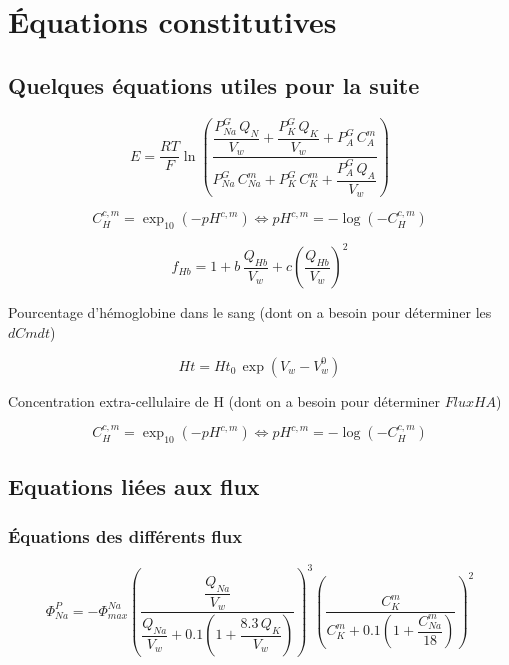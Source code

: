 \documentclass[a4paper,fleqn]{article}
\begin{document}
\section{Équations constitutives}

\subsection{Quelques équations utiles pour la suite}

\begin{equation}
E =  \frac{RT}{F}\ln{\left(\frac{\dfrac{P_{Na}^G\,Q_N}{V_w} + \dfrac{P_K^G\,Q_K}{V_w} + P_A^G\,C_A^m}{P_{Na}^G\,C_{Na}^m + P_K^G\,C_K^m + \dfrac{P_A^G\,Q_A}{V_w}}\right)}
\end{equation}

\begin{equation}
{C_{H}^{c,m}=\exp_{10}{\left(-pH^{c,m}\right)}}\Longleftrightarrow{pH^{c,m}=-\log{\left(-C_{H}^{c,m}\right)}}
\end{equation}

\begin{equation}
f_{Hb}=1+b\,\frac{Q_{Hb}}{V_w }+{c}\left(\frac{Q_{Hb}}{V_w }\right)^2
\end{equation}

Pourcentage d'hémoglobine dans le sang (dont on a besoin pour déterminer les $dCmdt$)

\begin{equation}
Ht = Ht_0\,\exp{(V_w-V_w^0)}
\end{equation}

Concentration extra-cellulaire de H (dont on a besoin pour déterminer $FluxHA$)

\begin{equation}
{C_{H}^{c,m}=\exp_{10}{\left(-pH^{c,m}\right)}}\Longleftrightarrow{pH^{c,m}=-\log{\left(-C_{H}^{c,m}\right)}}
\end{equation}

\subsection{Equations liées aux flux}
\subsubsection*{Équations des différents flux}

\begin{equation}
\Phi_{Na}^{P}=-\Phi_{max}^{Na}\left(\frac{\dfrac{Q_{Na}}{V_w}}{\dfrac{Q_{Na}}{V_w} + 0.1\left(1+\dfrac{8.3\,Q_{K}}{V_w}\right)}\right)^3\left(\dfrac{C_{K}^{m}}{C_{K}^{m}+0.1\left(1+\dfrac{C_{Na}^{m}}{18}\right)}\right)^2
\end{equation}
\end{document}
